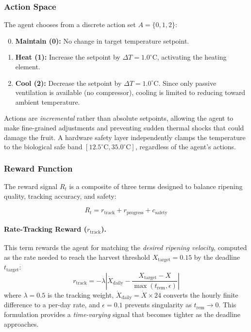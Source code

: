 \subsubsection{Action Space}
The agent chooses from a discrete action set $A = \{0, 1, 2\}$:
\begin{enumerate}
    \setcounter{enumi}{-1}
    \item \textbf{Maintain (0):} No change in target temperature setpoint.
    \item \textbf{Heat (1):} Increase the setpoint by $\Delta T = 1.0^\circ$C, activating the heating element.
    \item \textbf{Cool (2):} Decrease the setpoint by $\Delta T = 1.0^\circ$C. Since only passive ventilation is available (no compressor), cooling is limited to reducing toward ambient temperature.
\end{enumerate}

Actions are \emph{incremental} rather than absolute setpoints, allowing the agent to make fine-grained adjustments and preventing sudden thermal shocks that could damage the fruit. A hardware safety layer independently clamps the temperature to the biological safe band $[12.5^\circ\text{C}, 35.0^\circ\text{C}]$, regardless of the agent's actions.

\subsubsection{Reward Function}
\label{subsec:reward}

The reward signal $R_t$ is a composite of three terms designed to balance ripening quality, tracking accuracy, and safety:

\begin{equation}
    R_t = r_{\text{track}} + r_{\text{progress}} + c_{\text{safety}}
    \label{eq:reward}
\end{equation}

\paragraph{Rate-Tracking Reward ($r_{\text{track}}$).}
This term rewards the agent for matching the \emph{desired ripening velocity}, computed as the rate needed to reach the harvest threshold $X_{\text{target}} = 0.15$ by the deadline $t_{\text{target}}$:
\begin{equation}
    r_{\text{track}} = -\lambda \left| \dot{X}_{\text{daily}} - \frac{X_{\text{target}} - X}{\max(t_{\text{rem}}, \epsilon)} \right|
    \label{eq:r_track}
\end{equation}
where $\lambda = 0.5$ is the tracking weight, $\dot{X}_{\text{daily}} = \dot{X} \times 24$ converts the hourly finite difference to a per-day rate, and $\epsilon = 0.1$ prevents singularity as $t_{\text{rem}} \to 0$. This formulation provides a \emph{time-varying} signal that becomes tighter as the deadline approaches.

